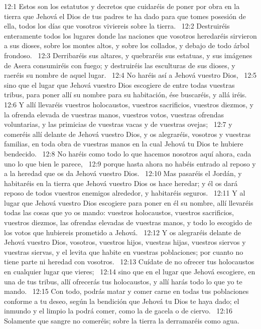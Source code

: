 12:1 Estos son los estatutos y decretos que cuidaréis de poner por obra en la tierra que Jehová el Dios de tus padres te ha dado para que tomes posesión de ella, todos los días que vosotros viviereis sobre la tierra.  
12:2 Destruiréis enteramente todos los lugares donde las naciones que vosotros heredaréis sirvieron a sus dioses, sobre los montes altos, y sobre los collados, y debajo de todo árbol frondoso.  
12:3 Derribaréis sus altares, y quebraréis sus estatuas, y sus imágenes de Asera consumiréis con fuego; y destruiréis las esculturas de sus dioses, y raeréis su nombre de aquel lugar.  
12:4 No haréis así a Jehová vuestro Dios,  
12:5 sino que el lugar que Jehová vuestro Dios escogiere de entre todas vuestras tribus, para poner allí su nombre para su habitación, ése buscaréis, y allá iréis.  
12:6 Y allí llevaréis vuestros holocaustos, vuestros sacrificios, vuestros diezmos, y la ofrenda elevada de vuestras manos, vuestros votos, vuestras ofrendas voluntarias, y las primicias de vuestras vacas y de vuestras ovejas;  
12:7 y comeréis allí delante de Jehová vuestro Dios, y os alegraréis, vosotros y vuestras familias, en toda obra de vuestras manos en la cual Jehová tu Dios te hubiere bendecido.  
12:8 No haréis como todo lo que hacemos nosotros aquí ahora, cada uno lo que bien le parece,  
12:9 porque hasta ahora no habéis entrado al reposo y a la heredad que os da Jehová vuestro Dios.  
12:10 Mas pasaréis el Jordán, y habitaréis en la tierra que Jehová vuestro Dios os hace heredar; y él os dará reposo de todos vuestros enemigos alrededor, y habitaréis seguros.  
12:11 Y al lugar que Jehová vuestro Dios escogiere para poner en él su nombre, allí llevaréis todas las cosas que yo os mando: vuestros holocaustos, vuestros sacrificios, vuestros diezmos, las ofrendas elevadas de vuestras manos, y todo lo escogido de los votos que hubiereis prometido a Jehová.  
12:12 Y os alegraréis delante de Jehová vuestro Dios, vosotros, vuestros hijos, vuestras hijas, vuestros siervos y vuestras siervas, y el levita que habite en vuestras poblaciones; por cuanto no tiene parte ni heredad con vosotros.  
12:13 Cuídate de no ofrecer tus holocaustos en cualquier lugar que vieres;  
12:14 sino que en el lugar que Jehová escogiere, en una de tus tribus, allí ofrecerás tus holocaustos, y allí harás todo lo que yo te mando.  
12:15 Con todo, podrás matar y comer carne en todas tus poblaciones conforme a tu deseo, según la bendición que Jehová tu Dios te haya dado; el inmundo y el limpio la podrá comer, como la de gacela o de ciervo.  
12:16 Solamente que sangre no comeréis; sobre la tierra la derramaréis como agua.  
